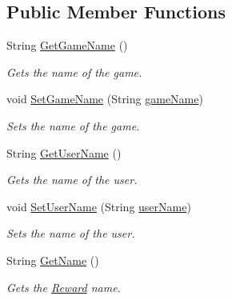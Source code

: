 \subsection*{Public Member Functions}
\begin{DoxyCompactItemize}
\item 
String \hyperlink{classcom_1_1shephertz_1_1app42_1_1paas_1_1sdk_1_1csharp_1_1reward_1_1_reward_ad3d59cb968aec21ce0afb105ed7dd796}{Get\+Game\+Name} ()
\begin{DoxyCompactList}\small\item\em Gets the name of the game. \end{DoxyCompactList}\item 
void \hyperlink{classcom_1_1shephertz_1_1app42_1_1paas_1_1sdk_1_1csharp_1_1reward_1_1_reward_ad67332e46d68fd7e18105eeec6bc58c2}{Set\+Game\+Name} (String \hyperlink{classcom_1_1shephertz_1_1app42_1_1paas_1_1sdk_1_1csharp_1_1reward_1_1_reward_a829138697d56a2827f29e7df7e8ec610}{game\+Name})
\begin{DoxyCompactList}\small\item\em Sets the name of the game. \end{DoxyCompactList}\item 
String \hyperlink{classcom_1_1shephertz_1_1app42_1_1paas_1_1sdk_1_1csharp_1_1reward_1_1_reward_aa4509ab1407ddf91ad2865a8d68c443b}{Get\+User\+Name} ()
\begin{DoxyCompactList}\small\item\em Gets the name of the user. \end{DoxyCompactList}\item 
void \hyperlink{classcom_1_1shephertz_1_1app42_1_1paas_1_1sdk_1_1csharp_1_1reward_1_1_reward_a422ea3522ab7430215f5d7251b21308c}{Set\+User\+Name} (String \hyperlink{classcom_1_1shephertz_1_1app42_1_1paas_1_1sdk_1_1csharp_1_1reward_1_1_reward_a5c201112a05fd475bfbf778ae39fedd4}{user\+Name})
\begin{DoxyCompactList}\small\item\em Sets the name of the user. \end{DoxyCompactList}\item 
String \hyperlink{classcom_1_1shephertz_1_1app42_1_1paas_1_1sdk_1_1csharp_1_1reward_1_1_reward_a7e9620ee10ef0d3da577290a76f2eb82}{Get\+Name} ()
\begin{DoxyCompactList}\small\item\em Gets the \hyperlink{classcom_1_1shephertz_1_1app42_1_1paas_1_1sdk_1_1csharp_1_1reward_1_1_reward}{Reward} name. \end{DoxyCompactList}\item 

\end{DoxyCompactItemize}
